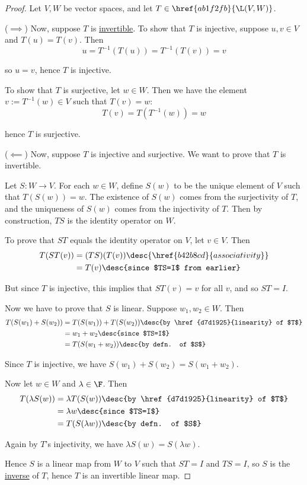 \begin{proof}
  Let $V,W$ be vector spaces, and let $T\in\href{ab1f2fb}{\L(V,W)}$.

  ($\implies$) Now, suppose $T$ is \href{e1ba7ee}{invertible}. To show that $T$
  is injective, suppose $u,v\in V$ and $T(u)=T(v)$. Then
  $$
    u=T^{-1}(T(u))=T^{-1}(T(v))=v
  $$

  so $u=v$, hence $T$ is injective.

  To show that $T$ is surjective, let $w\in W$. Then we have the element
  $v:=T^{-1}(w)\in V$ such that $T(v)=w$:
  $$
    T(v)=T(T^{-1}(w))=w
  $$

  hence $T$ is surjective.

  ($\impliedby$) Now, suppose $T$ is injective and surjective. We want to prove
  that $T$ is invertible.

  Let $S:W\to V$. For each $w\in W$, define $S(w)$ to be the unique element of
  $V$ such that $T(S(w))=w$. The existence of $S(w)$ comes from the
  surjectivity of $T$, and the uniqueness of $S(w)$ comes from the injectivity
  of $T$. Then by construction, $TS$ is the identity operator on $W$.

  To prove that $ST$ equals the identity operator on $V$, let $v\in V$. Then
  \begin{align*}
    T(ST(v)) &=(TS)(T(v))\desc{\href{b42b8cd}{associativity}} \\
             &=T(v)\desc{since $TS=I$ from earlier}
  \end{align*}

  But since $T$ is injective, this implies that $ST(v)=v$ for all $v$, and so
  $ST=I$.

  Now we have to prove that $S$ is linear. Suppose $w_1,w_2\in W$. Then
  \begin{align*}
    T(S(w_1)+S(w_2)) &=T(S(w_1))+T(S(w_2))\desc{by \href{d7d1925}{linearity} of $T$} \\
                     &=w_1+w_2\desc{since $TS=I$}                                    \\
                     &=T(S(w_1+w_2))\desc{by defn. of $S$}
  \end{align*}

  Since $T$ is injective, we have $S(w_1)+S(w_2)=S(w_1+w_2)$.

  Now let $w\in W$ and $\lambda\in\F$. Then
  \begin{align*}
    T(\lambda S(w)) &=\lambda T(S(w))\desc{by \href{d7d1925}{linearity} of $T$} \\
                    &=\lambda w\desc{since $TS=I$}                              \\
                    &=T(S(\lambda w))\desc{by defn. of $S$}
  \end{align*}

  Again by $T$'s injectivity, we have $\lambda S(w)=S(\lambda w)$.

  Hence $S$ is a linear map from $W$ to $V$ such that $ST=I$ and $TS=I$, so $S$
  is the \href{e1ba7ee}{inverse} of $T$, hence $T$ is an invertible linear map.
\end{proof}

